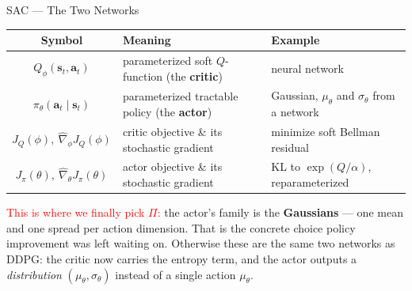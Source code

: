 \begin{frame}{SAC --- The Two Networks}
\renewcommand{\arraystretch}{1.8}
\begin{center}
\small
\begin{tabular}{|c|p{}|p{}|}
\hline
\textbf{Symbol} & \textbf{Meaning} & \textbf{Example} \\
\hline
$Q_\phi(\mathbf{s}_t, \mathbf{a}_t)$
    & parameterized soft $Q$-function (the \textbf{critic})
    & neural network \\
\hline
$\pi_\theta(\mathbf{a}_t \mid \mathbf{s}_t)$
    & parameterized tractable policy (the \textbf{actor})
    & Gaussian, $\mu_\theta$ and $\sigma_\theta$ from a network \\
\hline
$J_Q(\phi),\ \hat{\nabla}_\phi J_Q(\phi)$
    & critic objective \& its stochastic gradient
    & minimize soft Bellman residual \\
\hline
$J_\pi(\theta),\ \hat{\nabla}_\theta J_\pi(\theta)$
    & actor objective \& its stochastic gradient
    & KL to $\exp(Q/\alpha)$, reparameterized \\
\hline
\end{tabular}
\end{center}
\vspace{0.4em}
{\footnotesize \textcolor{red}{This is where we finally pick $\Pi$:} the actor's family is the \textbf{Gaussians} --- one mean and one spread per action dimension. That is the concrete choice policy improvement was left waiting on. Otherwise these are the same two networks as DDPG: the critic now carries the entropy term, and the actor outputs a \emph{distribution} $(\mu_\theta,\sigma_\theta)$ instead of a single action $\mu_\theta$.}
\end{frame}
